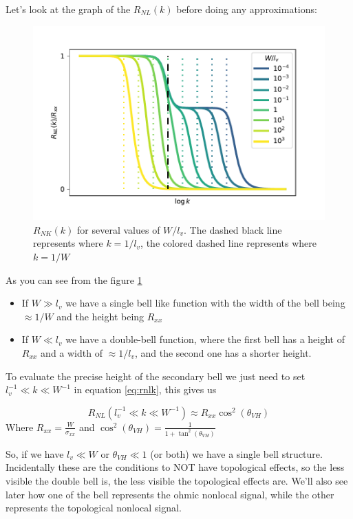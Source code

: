 Let's look at the graph of the $R_{NL}(k)$ before doing any approximations:
\begin{figure}[h!]
    \centering
    \includegraphics[width=\linewidth]{Immagini/rnl/widths.pdf}
    \caption{$R_{NK}(k)$ for several values of $W/l_v$. The dashed black line represents where $k=1/l_v$, the colored dashed line represents where $k=1/W$}
    \label{fig:RNLk}
\end{figure}
As you can see from the figure \ref{fig:RNLk} 
\begin{itemize}
    \item If $W\gg l_v$ we have a single bell like function with the width of the bell being $\approx 1/W$ and the height being $R_{xx}$ 
    \item If $W\ll l_v$ we have a double-bell function, where the first bell has a height of $R_{xx}$ and a width of $\approx 1/l_v$, and the second one has a shorter height.
\end{itemize}    
To evaluate the precise height of the secondary bell we just need to set $l_v^{-1}\ll k \ll W^{-1}$ in equation \ref{eq:rnlk}, this gives us

\begin{equation}
    R_{NL}(l_v^{-1}\ll k \ll W^{-1})\approx R_{xx}\cos^2(\theta_{VH})   
    \label{eq:plateau} 
\end{equation}
Where $R_{xx}=\frac{W}{\sigma_{xx}}$ and $\cos^2(\theta_{VH})=\frac{1}{1+\tan^2(\theta_{VH})}$

So, if we have $l_v\ll W$ or $\theta_{VH}\ll 1$ (or both) we have a single bell structure. Incidentally these are the conditions to NOT have topological effects, so the less visible the double bell is, the less visible the topological effects are. We'll also see later how one of the bell represents the ohmic nonlocal signal, while the other represents the topological nonlocal signal. 

